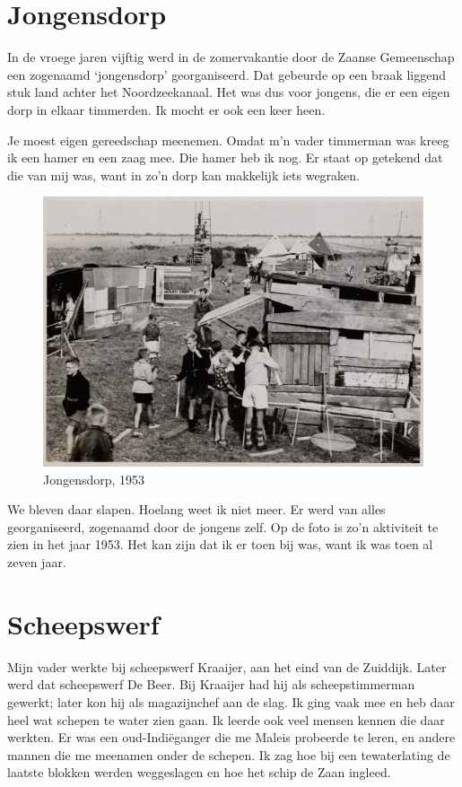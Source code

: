 \documentclass[10pt,twoside, openright]{memoir}
\newlength{\drop}%
\begin{document}
\section{Jongensdorp} %
\label{cha:jongensdrop}

In de vroege jaren vijftig werd in de zomervakantie door de Zaanse Gemeenschap een zogenaamd `jongensdorp' georganiseerd. Dat gebeurde op een braak liggend stuk land achter het Noordzeekanaal. Het was dus voor jongens, die er een eigen dorp in elkaar timmerden. Ik mocht er ook een keer heen. 

Je moest eigen gereedschap meenemen. Omdat m’n vader timmerman was kreeg ik een hamer en een zaag mee. Die hamer heb ik nog. Er staat op getekend dat die van mij was, want in zo’n dorp kan makkelijk iets wegraken. 

\begin{figure}
\includegraphics[width=\textwidth]{img/87-88jongensdorp}
\caption*{\footnotesize Jongensdorp, 1953}
\end{figure}

We bleven daar slapen. Hoelang weet ik niet meer. Er werd van alles georganiseerd, zogenaamd door de jongens zelf. Op de foto is zo’n aktiviteit te zien in het jaar 1953. Het kan zijn dat ik er toen bij was, want ik was toen al zeven jaar.

\section{Scheepswerf} %
\label{cha:scheepswerf}

Mijn vader werkte bij scheepswerf Kraaijer, aan het eind van de Zuiddijk. Later werd dat scheepswerf De Beer. Bij Kraaijer had hij als scheepstimmerman gewerkt; later kon hij als magazijnchef aan de slag. Ik ging vaak mee en heb daar heel wat schepen te water zien gaan. Ik leerde ook veel mensen kennen die daar werkten. Er was een oud-Indiëganger die me Maleis probeerde te leren, en andere mannen die me meenamen onder de schepen. Ik zag hoe bij een tewaterlating de laatste blokken werden weggeslagen en hoe het schip de Zaan ingleed. 
\end{document}

